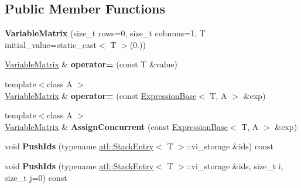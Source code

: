 \subsection*{Public Member Functions}
\begin{DoxyCompactItemize}
\item 
\hypertarget{structatl_1_1_variable_matrix_af656ffe0e832bf82e4d4246c4fae3058}{{\bfseries Variable\+Matrix} (size\+\_\+t rows=0, size\+\_\+t columns=1, T initial\+\_\+value=static\+\_\+cast$<$ T $>$(0.))}\label{structatl_1_1_variable_matrix_af656ffe0e832bf82e4d4246c4fae3058}

\item 
\hypertarget{structatl_1_1_variable_matrix_ac83b3849f3f3e984819716b69596fe63}{\hyperlink{structatl_1_1_variable_matrix}{Variable\+Matrix} \& {\bfseries operator=} (const T \&value)}\label{structatl_1_1_variable_matrix_ac83b3849f3f3e984819716b69596fe63}

\item 
\hypertarget{structatl_1_1_variable_matrix_adfaf4a2ae2591236e5df9d96aaa19783}{{\footnotesize template$<$class A $>$ }\\\hyperlink{structatl_1_1_variable_matrix}{Variable\+Matrix} \& {\bfseries operator=} (const \hyperlink{structatl_1_1_expression_base}{Expression\+Base}$<$ T, A $>$ \&exp)}\label{structatl_1_1_variable_matrix_adfaf4a2ae2591236e5df9d96aaa19783}

\item 
\hypertarget{structatl_1_1_variable_matrix_a042ca0e4a046575dbe471fd107526bcb}{{\footnotesize template$<$class A $>$ }\\\hyperlink{structatl_1_1_variable_matrix}{Variable\+Matrix} \& {\bfseries Assign\+Concurrent} (const \hyperlink{structatl_1_1_expression_base}{Expression\+Base}$<$ T, A $>$ \&exp)}\label{structatl_1_1_variable_matrix_a042ca0e4a046575dbe471fd107526bcb}

\item 
\hypertarget{structatl_1_1_variable_matrix_a467767c1d7a162b3ec0d56c85f05822e}{void {\bfseries Push\+Ids} (typename \hyperlink{structatl_1_1_stack_entry}{atl\+::\+Stack\+Entry}$<$ T $>$\+::vi\+\_\+storage \&ids) const }\label{structatl_1_1_variable_matrix_a467767c1d7a162b3ec0d56c85f05822e}

\item 
\hypertarget{structatl_1_1_variable_matrix_a87472f5b1f82f7b977d94fe9172e7d28}{void {\bfseries Push\+Ids} (typename \hyperlink{structatl_1_1_stack_entry}{atl\+::\+Stack\+Entry}$<$ T $>$\+::vi\+\_\+storage \&ids, size\+\_\+t i, size\+\_\+t j=0) const }\label{structatl_1_1_variable_matrix_a87472f5b1f82f7b977d94fe9172e7d28}


\end{DoxyCompactItemize}
